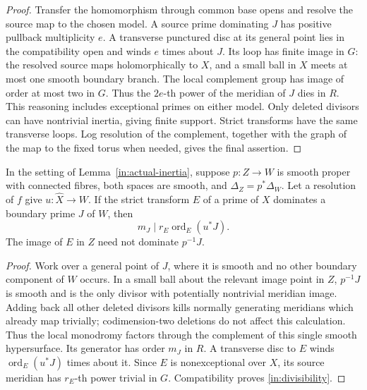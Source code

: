 \begin{proof}
Transfer the homomorphism through common base opens and resolve the
source map to the chosen model.  A source prime dominating \(J\)
has positive pullback multiplicity \(e\).  A transverse punctured
disc at its general point lies in the compatibility open and winds
\(e\) times about \(J\).  Its loop has finite image in \(G\): the
resolved source maps holomorphically to \(X\), and a small ball in
\(X\) meets at most one smooth boundary branch.  The local
complement group has image of order at most two in \(G\).  Thus
the \(2e\)-th power of the meridian of \(J\) dies in \(R\).
This reasoning includes exceptional primes on either model.
Only deleted divisors can have nontrivial inertia, giving finite
support.  Strict transforms have the same transverse loops.
Log resolution of the complement, together with the graph of the
map to the fixed torus when needed, gives the final assertion.
\end{proof}

\begin{lemma}\label{in:local-divisibility}
In the setting of Lemma~\ref{in:actual-inertia}, suppose
\(p:Z\to W\) is smooth proper with connected fibres, both spaces
are smooth, and \(\Delta_Z=p^*\Delta_W\).  Let a resolution of
\(f\) give \(u:\widehat X\to W\).  If the strict transform \(E\)
of a prime of \(X\) dominates a boundary prime \(J\) of \(W\), then
\begin{equation}\label{in:divisibility}
 m_J\mid r_E\operatorname{ord}_E(u^*J).
\end{equation}
The image of \(E\) in \(Z\) need not dominate \(p^{-1}J\).
\end{lemma}

\begin{proof}
Work over a general point of \(J\), where it is smooth and no
other boundary component of \(W\) occurs.  In a small ball about
the relevant image point in \(Z\), \(p^{-1}J\) is smooth and is
the only divisor with potentially nontrivial meridian image.
Adding back all other deleted divisors kills normally generating
meridians which already map trivially; codimension-two deletions
do not affect this calculation.  Thus the local monodromy factors
through the complement of this single smooth hypersurface.
Its generator has order \(m_J\) in \(R\).  A transverse disc to
\(E\) winds \(\operatorname{ord}_E(u^*J)\) times about it.  Since
\(E\) is nonexceptional over \(X\), its source meridian has
\(r_E\)-th power trivial in \(G\).  Compatibility proves
\eqref{in:divisibility}.
\end{proof}

